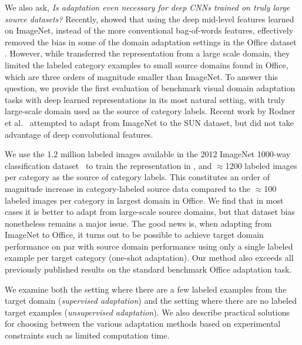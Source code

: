 We also ask, \textit{Is adaptation even necessary for deep CNNs trained on truly large source datasets?}
Recently, \cite{deeplearning-arxiv-2013} showed that using the deep mid-level features learned on ImageNet, instead of the more conventional bag-of-words features, effectively removed the bias in some of the domain adaptation settings in the Office dataset \cite{saenko-eccv10}.
However, while \cite{deeplearning-arxiv-2013} transferred the representation from a large scale domain, they limited the labeled category examples to small source domains found in Office, 
which are three orders of magnitude smaller than ImageNet. 
To answer this question, we provide the first evaluation of benchmark visual domain adaptation tasks with deep learned representations in its most natural setting, with truly large-scale domain used as the source of category labels.
Recent work by Rodner et al.~\cite{rodner-arxiv13} attempted to adapt from ImageNet to the SUN dataset, but did not take advantage of deep convolutional features. 

We use the 1.2 million
labeled images available in the 2012 ImageNet 1000-way classification
dataset~\cite{ilsvrc2012} to train the representation in \cite{supervision}, and  $\approx$1200 labeled images per category as the source of category labels.
This constitutes an order of magnitude increase in category-labeled source data compared to the  $\approx$100 labeled images per category in largest domain in Office.  We find that in most cases it is better to adapt from large-scale source domains, but that dataset bias nonetheless remains a major issue.
The good news is, when adapting
from ImageNet to Office, it turns out to be possible to achieve target domain
performance on par with source domain performance using only a single labeled
example per target category (one-shot adaptation).  Our method also exceeds all previously published
results on the standard benchmark Office adaptation task.

We examine both the setting where there are a few labeled examples from the target domain (\emph{supervised adaptation}) and the setting where there are no labeled target examples (\emph{unsupervised adaptation}). We also describe practical solutions for choosing between the various adaptation methods based on experimental constraints such as limited computation time. 
